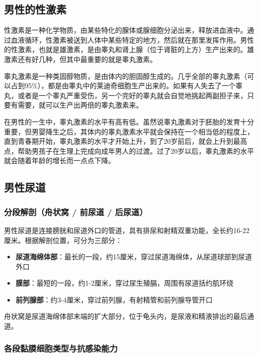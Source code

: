 \subsection{男性的性激素}

性激素是一种化学物质，由某些特化的腺体或腺细胞分泌出来，释放进血液中。通过血液循环，性激素被送到人体中某些特定的地方，然后就在那里发挥作用。男性的性激素，也就是雄激素，是由睾丸和肾上腺（位于肾脏的上方）生产出来的。雄激素还有好几种，但其中最重要的就是睾丸激素。

睾丸激素是一种类固醇物质，是由体内的胆固醇生成的。几乎全部的睾丸激素（可以占到95\%），都是由睾丸中的莱迪奇细胞生产出来的。如果有人失去了一个睾丸，或者是一个睾丸严重受伤，另一个完好的睾丸就会自觉地挑起两副担子来，只要有需要，就可以生产出两倍的睾丸激素来。

在男性的一生中，睾丸激素的水平有高有低。虽然说睾丸激素对于胚胎的发育十分重要，但男婴降生之后，其体内的睾丸激素水平就会保持在一个相当低的程度上，直到青春期开始，睾丸激素的水平才开始上升，到了20岁前后，就会上升到最高点，帮助男孩子在生理上完成向成年男人的过渡。过了20岁以后，睾丸激素的水平就会随着年龄的增长而一点点下降。

\subsection{男性尿道}
\subsubsection{分段解剖（舟状窝 / 前尿道 / 后尿道）}

男性尿道是连接膀胱和尿道外口的管道，具有排尿和射精双重功能，全长约16-22厘米。根据解剖位置，可分为三部分：

\begin{itemize}
    \item \textbf{尿道海绵体部}：最长的一段，约15厘米，穿过尿道海绵体，从尿道球部到尿道外口
    \item \textbf{膜部}：最短的一段，约1-2厘米，穿过尿生殖膈，周围有尿道括约肌环绕
    \item \textbf{前列腺部}：约3-4厘米，穿过前列腺，有射精管和前列腺导管开口
\end{itemize}

舟状窝是尿道海绵体部末端的扩大部分，位于龟头内，是尿液和精液排出的最后通道。

\subsubsection{各段黏膜细胞类型与抗感染能力}

